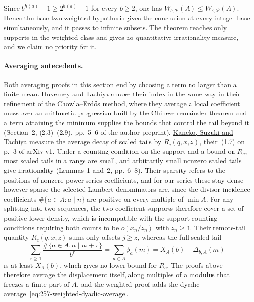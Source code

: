 \documentclass[11pt]{article}
\theoremstyle{plain}
\theoremstyle{definition}
\theoremstyle{remark}
\begin{document}
Since $b^{h(a)}-1\ge2^{h(a)}-1$ for every $b\ge2$, one has
$W_{b,\mathcal P}(A)\le W_{2,\mathcal P}(A)$. Hence the base-two weighted
hypothesis gives the conclusion at every integer base simultaneously, and
it passes to infinite subsets. The theorem reaches only supports in the
weighted class and gives no quantitative irrationality measure, and we
claim no priority for it.

\paragraph{Averaging antecedents.}
Both averaging proofs in this section end by choosing a term no larger than a
finite mean.
\href{https://danielduverney.fr/documents/theorie-des-nombres/DuverneyTachiya190522.pdf}{Duverney
and Tachiya} choose their index in the same way in their refinement of the
Chowla--Erd\H{o}s method, where they average a local coefficient mass over
an arithmetic progression built by the Chinese remainder theorem and a term
attaining the minimum supplies the bounds that control the tail beyond it
(Section~2, (2.3)--(2.9), pp.~5--6 of the author preprint).
\href{https://arxiv.org/abs/2601.20743}{Kaneko, Suzuki and Tachiya} measure
the average decay of scaled tails by $R_c(q,x,z)$, their~(1.7) on p.~3 of
arXiv v1.  Under a counting condition on the support and a bound on $R_c$,
most scaled tails in a range are small, and arbitrarily small nonzero scaled
tails give irrationality (Lemmas~1 and~2, pp.~6--8).
Their sparsity refers to the positions of nonzero power-series
coefficients, and for our series these stay dense however sparse the
selected Lambert denominators are, since the divisor-incidence
coefficients $\#\{a\in A:a\mid n\}$ are positive on every multiple of
$\min A$. For any splitting into two sequences, the two coefficient
supports therefore cover a set of positive lower density, which is
incompatible with the support-counting conditions
\cite[Theorem~1(iii), p.~3, and Theorem~3(iv), p.~5]{kanekosuzukitachiya}
requiring both counts to be $o(x_n/z_n)$ with $z_n\ge1$.  Their remote-tail
quantity $R_c(q,x,z)$ sums only offsets $j\ge z$, whereas the full scaled tail
\[
 \sum_{r\ge1}\frac{\#\{a\in A:a\mid m+r\}}{b^r}
 =\sum_{a\in A}\phi_a(m)=X_A(b)+\Delta_{b,A}(m)
\]
is at least $X_A(b)$, which gives no lower bound for $R_c$. The proofs
above therefore average the displacement itself, along multiples of a
modulus that freezes a finite part of $A$, and the weighted proof adds the
dyadic average~\eqref{eq:257-weighted-dyadic-average}.
\end{document}
